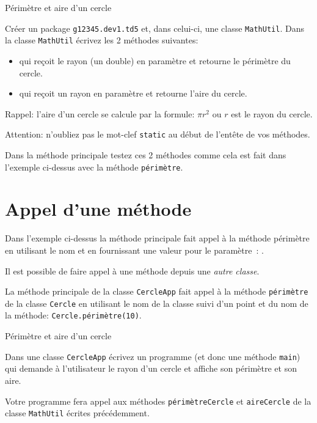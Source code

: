 \documentclass[a4paper,11pt]{article}
\begin{document}
	 \begin{Exercice}{Périmètre et aire d'un cercle}
		
		Créer un package \texttt{g12345.dev1.td5} et, dans celui-ci, une classe \texttt{MathUtil}.
		Dans la classe \texttt{MathUtil} écrivez les 2 méthodes suivantes: 
		\begin{itemize}
			\item	{} 
				qui reçoit le rayon (un double) en paramètre et retourne le périmètre du cercle.
			\item {} 
				qui reçoit un rayon en paramètre et retourne l'aire du cercle.
		\end{itemize}
		
		Rappel: l'aire d'un cercle se calcule par la formule: $\pi r^2$ ou  $r$ est le rayon du cercle.
		
		Attention: n'oubliez pas le mot-clef \texttt{static} au début de l'entête de vos méthodes.
		
		Dans la méthode principale testez ces 2 méthodes comme cela est fait dans l'exemple ci-dessus avec la méthode 
		\texttt{périmètre}.
	\end{Exercice} 


\section{Appel d'une méthode}

	Dans l'exemple ci-dessus la méthode principale fait appel à la méthode périmètre en utilisant le nom 
	et en fournissant une valeur pour le paramètre~: 
	.
	
	Il est possible de faire appel à une méthode depuis une \emph{autre classe}.
	

	La méthode principale de la classe \texttt{CercleApp} fait appel à la méthode \texttt{périmètre}
	de la classe \texttt{Cercle} en utilisant le nom de la classe suivi d'un point et du nom de la méthode: \texttt{Cercle.périmètre(10)}.
	
	 \begin{Exercice}{Périmètre et aire d'un cercle}
		
		Dans une classe \texttt{CercleApp} écrivez un programme (et donc une méthode \texttt{main})
		qui demande à l'utilisateur le rayon d'un cercle et affiche son périmètre et son aire.
		
		Votre programme fera appel aux méthodes \texttt{périmètreCercle} et \texttt{aireCercle} de la classe
		\texttt{MathUtil} écrites précédemment.
	\end{Exercice} 
	
\end{document}
